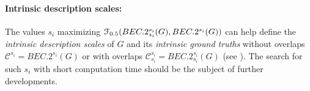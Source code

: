 \documentclass[12pt]{article}
\theoremstyle{thmstyleone}%
\theoremstyle{definition}
\newcommand\reallywidehat[1]{%
\savestack{\tmpbox}{\stretchto{%
  \scaleto{%
    \scalerel*[\widthof{\ensuremath{#1}}]{\kern-.6pt\bigwedge\kern-.6pt}%
    {\rule[-\textheight/2]{1ex}{\textheight}}%
  }{\textheight}%
}{0.8ex}}%
\stackon[1pt]{#1}{\tmpbox}%
}
\begin{document}
\vspace{-0.50cm}
\paragraph{Intrinsic description scales:}
The values $s_i$ maximizing $\EuScript{F}_{0.5}(BEC.2_{s_i}^{s_i}(G),BEC.2^{s_i}(G))$ can help define the {\it intrinsic description scales} of $G$ and its {\it intrinsic ground truths}
without overlaps $\mathcal{C}^{s_i}=BEC.2^{s_i}(G)$ or with overlaps $\mathcal{C}^{s_i}_{s_i}=BEC.2_{s_i}^{s_i}(G)$
(see \cite{Gaume_BEC1_2025, Ronhovde_2009}).
The search for such $s_i$ with short computation time should be the subject of further developments.

%
\end{document}
